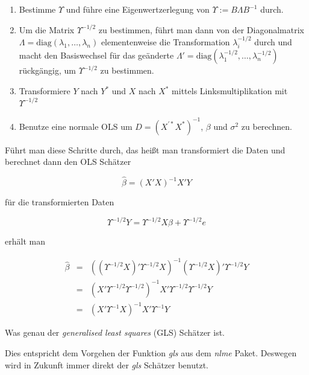 \documentclass[12pt,a4paper]{article}
\theoremstyle{definition}
\theoremstyle{definition}
\theoremstyle{definition}
\theoremstyle{definition}
\begin{document}
\begin{enumerate}
\item Bestimme $\Upsilon$ und führe eine Eigenwertzerlegung von $\Upsilon := B \Lambda B^{-1}$ durch.
\item Um die Matrix $\Upsilon^{-1/2}$ zu bestimmen, führt man dann von der Diagonalmatrix $\Lambda = \text{diag}(\lambda_1, \ldots, \lambda_n)$ elementenweise die Transformation $\lambda_i^{-1/2}$ durch und macht den Basiswechsel für das geänderte $\Lambda' = \text{diag}(\lambda_1^{-1/2}, \ldots, \lambda_n^{-1/2})$ rückgängig, um $\Upsilon^{-1/2}$ zu bestimmen.
\item Transformiere $Y$ nach $Y^{*}$ und $X$ nach $X^{*}$ mittels Linksmultiplikation mit $\Upsilon^{-1/2}$
\item Benutze eine normale OLS um $D=(X^{'*}X^{*})^{-1}$, $\beta$ und $\sigma^2$ zu berechnen.
\end{enumerate}

Führt man diese Schritte durch, das heißt man transformiert die Daten und berechnet dann den OLS Schätzer 

\begin{equation*}
\hat{\beta} = (X' X)^{-1} X' Y
\end{equation*}

für die transformierten Daten 

\begin{equation*}
\Upsilon^{-1/2} Y = \Upsilon^{-1/2} X \beta + \Upsilon^{-1/2} e
\end{equation*}

erhält man

\begin{eqnarray*}
\hat{\beta} &=& ((\Upsilon^{-1/2} X)' \Upsilon^{-1/2} X)^{-1} (\Upsilon^{-1/2} X)' \Upsilon^{-1/2} Y \\
&=& (X' \Upsilon^{-1/2} \Upsilon^{-1/2})^{-1} X' \Upsilon^{-1/2} \Upsilon^{-1/2} Y \\
&=& (X' \Upsilon^{-1} X)^{-1} X' \Upsilon^{-1} Y
\end{eqnarray*}
 
Was genau der \textit{generalised least squares} (GLS) Schätzer ist.

Dies entspricht dem Vorgehen der Funktion \textit{gls} aus dem \textit{nlme} Paket. Deswegen wird in Zukunft immer direkt der \textit{gls} Schätzer benutzt.
\end{document}
